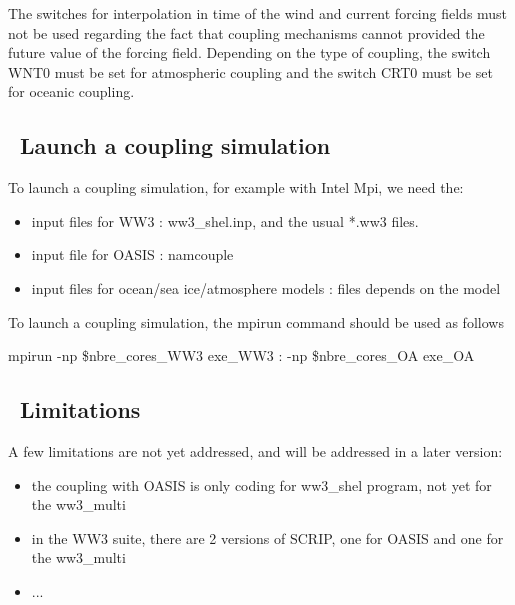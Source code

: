 The switches for interpolation in time of the wind and current forcing fields must not be used regarding the
fact that coupling mechanisms cannot provided the future value of the forcing field.
Depending on the type of coupling, the switch {\code WNT0} must be set for atmospheric coupling and the switch {\code CRT0} must be set for oceanic coupling.

\vssub
\subsection{~Launch a coupling simulation} \label{sec:couplingC}
\vssub

To launch a coupling simulation, for example with Intel Mpi, we need the: 

\begin{itemize}
\item input files for WW3 : {\file ww3\_shel.inp}, and the usual *.ww3 files.
\item input file for OASIS : {\file namcouple}
\item input files for ocean/sea ice/atmosphere models : {\file files depends on the model}
\end{itemize}

To launch a coupling simulation, the {\file mpirun} command should be used as follows

{\code mpirun -np \$nbre\_cores\_WW3 exe\_WW3 : -np \$nbre\_cores\_OA exe\_OA}

\vssub
\subsection{~Limitations} \label{sec:couplingD}
\vssub

A few limitations are not yet addressed, and will be addressed in a later version:

\begin{itemize}
\item the coupling with OASIS is only coding for ww3\_shel program, not yet for the {\code ww3\_multi}
\item in the WW3 suite, there are 2 versions of SCRIP, one for OASIS and one for the {\code ww3\_multi}
\item ...
\end{itemize}
